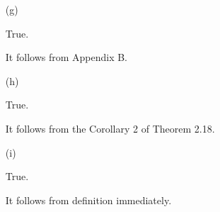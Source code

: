 \begin{Exercise}
\begin{enumerate}[(a)]
		\item[(g)]
		\begin{answer}
			True.
		\end{answer}
		\begin{solution}
			It follows from Appendix B.
		\end{solution}
		
		\item[(h)]
		\begin{answer}
			True.
		\end{answer}
		\begin{solution}
			It follows from the Corollary 2 of Theorem 2.18.
		\end{solution}
		
		\item[(i)]
		\begin{answer}
			True.
		\end{answer}
		\begin{solution}
			It follows from definition immediately.
		\end{solution}
		
	\end{enumerate}
\end{Exercise}
